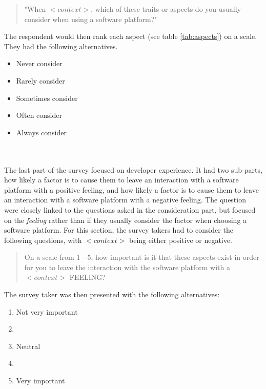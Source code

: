 \documentclass{cslthse-msc}
\begin{document}
    \begin{quote}
        "When $<context>$, which of these traits or aspects do you usually consider when using a software platform?"
    \end{quote}
    The respondent would then rank each aspect (see table \ref{tab:aspects}) on a scale. They had the following alternatives.
    \begin{itemize}[label={-}]
        \item Never consider
        \item Rarely consider
        \item Sometimes consider
        \item Often consider
        \item Always consider
    \end{itemize}
    \\ \\
    The last part of the survey focused on developer experience. It had
    two sub-parts, how likely a factor is to cause them to leave an
    interaction with a software platform with a positive feeling, and how
    likely a factor is to cause them to leave an interaction with a software
    platform with a negative feeling. The question were closely linked to
    the questions asked in the consideration part, but focused on the
    \textit{feeling} rather than if they usually consider the factor when choosing
    a software platform. For this section, the survey takers had to consider the following questions, with $<context>$ being either positive or negative.
    \begin{quote}
        On a scale from 1 - 5, how important is it that these aspects exist in order for you to leave the
        interaction with the software platform with a $<context>$ FEELING?
    \end{quote}
    The survey taker was then presented with the following alternatives:
    \begin{enumerate}[label={\arabic* - }]
        \item Not very important
        \item
        \item Neutral
        \item
        \item Very important
    \end{enumerate}
\end{document}
